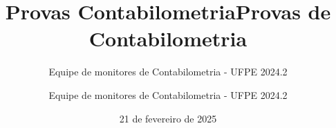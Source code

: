 \documentclass[brazilian,a4paper,article,12pt]{memoir}
\title{Provas Contabilometria}
\author{Equipe de monitores de Contabilometria - UFPE 2024.2}
\date{21 de fevereiro de 2025}
\title{Provas de Contabilometria}
\author{Equipe de monitores de Contabilometria - UFPE 2024.2}
\begin{document}
\frontmatter
\begin{titlingpage}
	\maketitle
\end{titlingpage}

\setlrmarginsandblock{3cm}{2cm}{*}
\setulmarginsandblock{3cm}{2cm}{*}
\checkandfixthelayout

\mainmatter


\end{document}
